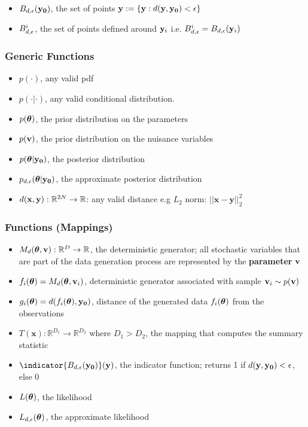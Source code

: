 \begin{itemize}
\item $B_{d,\epsilon}(\mathbf{y_0})$, the set of points $\mathbf{y} := \{\mathbf{y}: d(\mathbf{y}, \mathbf{y_0}) < \epsilon \}$
\item $B_{d,\epsilon}^i$, the set of points defined around $\mathbf{y}_i$ i.e. $B_{d,\epsilon}^i = B_{d,\epsilon}(\mathbf{y}_i)$
\end{itemize}
    
\subsubsection*{Generic Functions}
\label{sec:generic-functions}

\begin{itemize}
\item $p(\cdot)$, any valid pdf
\item $p(\cdot | \cdot)$, any valid conditional distribution.
\item $p(\boldsymbol{\theta})$, the prior distribution on the parameters
\item $p(\mathbf{v})$, the prior distribution on the nuisance variables
\item $p(\boldsymbol{\theta}|\mathbf{y_0})$, the posterior distribution
\item $p_{d,\epsilon}(\boldsymbol{\theta}|\mathbf{y_0})$, the approximate posterior
  distribution  
\item $d(\mathbf{x}, \mathbf{y}): \mathbb{R}^{2N} \rightarrow \mathbb{R}$: any valid
  distance e.g $L_2$ norm: $||\mathbf{x}-\mathbf{y}||_2^2$
\end{itemize}

\subsubsection*{Functions (Mappings)}
\label{sec:functions-mappings}

\begin{itemize}
\item $M_d(\boldsymbol{\theta}, \mathbf{v}): \mathbb{R}^D \rightarrow \mathbb{R}$, the deterministic
  generator; all stochastic variables that are part of the data generation process are represented by the \textbf{parameter} $\mathbf{v}$
\item $f_i(\boldsymbol{\theta}) = M_d(\boldsymbol{\theta}, \mathbf{v}_i)$, deterministic generator associated with sample $\mathbf{v}_i \sim p(\mathbf{v})$
\item $g_i(\boldsymbol{\theta}) = d(f_i(\boldsymbol{\theta}), \mathbf{y_0})$, distance of the generated data $f_i(\boldsymbol{\theta})$ from the observations
\item $T(\mathbf{x}): \mathbb{R}^{D_1} \rightarrow \mathbb{R}^{D_2}$
  where $D_1 > D_2$, the mapping that computes the summary statistic
\item $\indicator{\region(\data)}(\yb)$, the indicator function; returns 1 if $d(\mathbf{y}, \mathbf{y_0})<\epsilon$, else 0
\item $L(\boldsymbol{\theta})$, the likelihood
\item $L_{d,\epsilon}(\boldsymbol{\theta})$, the approximate likelihood
\end{itemize}
